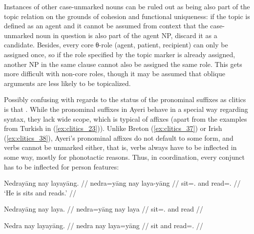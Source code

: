 \begin{morphlex}
\ex\label{ex:clitics_46}
\xe
\end{morphlex}

Instances of other case-unmarked nouns can be ruled out as being also part of
the topic relation on the grounds of cohesion and functional uniqueness: if the
topic is defined as an agent and it cannot be assumed from context that the
case-unmarked noun in question is also part of the agent NP, discard it as a
candidate. Besides, every core θ-role (agent, patient, recipient) can only be
assigned once, so if the role specified by the topic marker is already
assigned, another NP in the same clause cannot also be assigned the same role.
This gets more difficult with non-core roles, though it may be assumed that
oblique arguments are less likely to be topicalized.

Possibly confusing with regards to the status of the pronominal suffixes as
cli\-tics is that .
While the pronominal suffixes in Ayeri behave in a special way regarding
syntax, they lack wide scope, which is typical of affixes (apart from the
examples from Turkish in (\ref{ex:clitics_23})). Unlike Breton
(\ref{ex:clitics_37}) or Irish (\ref{ex:clitics_38}), Ayeri's pronominal
affixes do not default to some form, and verbs cannot be unmarked either, that
is, verbs always have to be inflected in some way, mostly for phonotactic
reasons. Thus, in coordination, every conjunct has to be inflected for person
features:

\pex\label{ex:clitics_47}
\a\label{ex:clitics_47a}\begingl
	\gla Nedrayāng nay layayāng. //
	\glb nedra=yāng nay laya-yāng //
	\glc sit=\TsgM{}.\Aarg{} and read=\TsgM{}.\Aarg{} //
	\glft `He is sits and reads.' //
\endgl

\a\label{ex:clitics_47b}\ljudge{*}\begingl
	\gla Nedrayāng nay laya. //
	\glb nedra=yāng nay laya //
	\glc sit=\TsgM{}.\Aarg{} and read //
\endgl

\a\label{ex:clitics_47c}\ljudge{*}\begingl
	\gla Nedra nay layayāng. //
	\glb nedra nay laya=yāng //
	\glc sit and read=\TsgM{}.\Aarg{} //
\endgl
\xe

